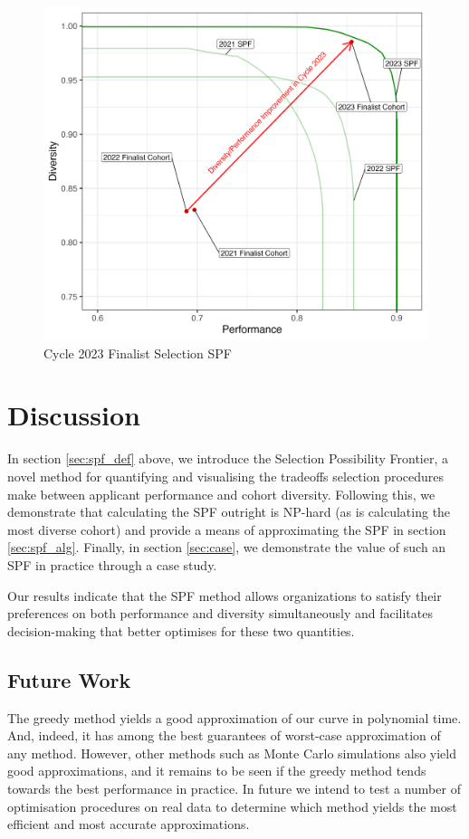 \begin{figure}[htb]
    \centering
    \includegraphics[width=.6\textwidth,keepaspectratio]{figures/spf/yr3_spf_finalist.png}
    \caption{Cycle 2023 Finalist Selection SPF}\label{fig:yr3_spf}
\end{figure}

\section{Discussion}\label{sec:disc}
In section \ref{sec:spf_def} above, we introduce the Selection Possibility Frontier, a novel method for quantifying and visualising the tradeoffs selection procedures make between applicant performance and cohort diversity. Following this, we demonstrate that calculating the SPF outright is NP-hard (as is calculating the most diverse cohort) and provide a means of approximating the SPF in section \ref{sec:spf_alg}. Finally, in section \ref{sec:case}, we demonstrate the value of such an SPF in practice through a case study.

Our results indicate that the SPF method allows organizations to satisfy their preferences on both performance and diversity simultaneously and facilitates decision-making that better optimises for these two quantities.

\subsection{Future Work}
The greedy method yields a good approximation of our curve in polynomial time. And, indeed, it has among the best guarantees of worst-case approximation of any method. However, other methods such as Monte Carlo simulations also yield good approximations, and it remains to be seen if the greedy method tends towards the best performance in practice. In future we intend to test a number of optimisation procedures on real data to determine which method yields the most efficient and most accurate approximations.

